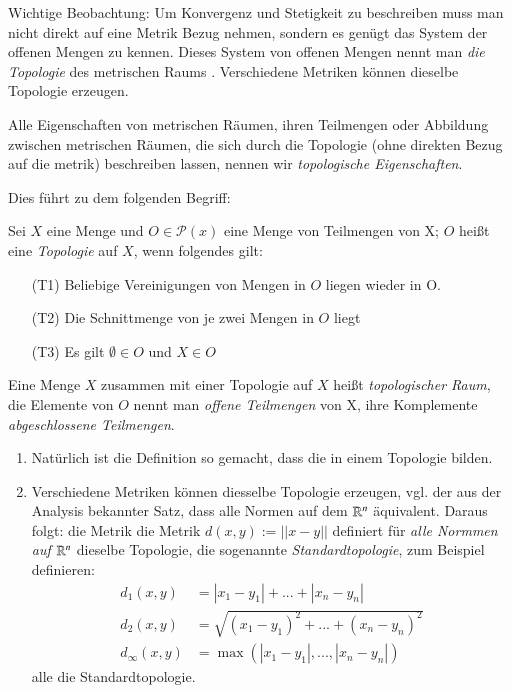 \documentclass[a4paper,10pt]{scrartcl}
\begin{document}
Wichtige Beobachtung: Um Konvergenz und Stetigkeit zu beschreiben muss man nicht direkt auf eine Metrik Bezug nehmen, sondern es genügt das System der offenen Mengen zu kennen.  Dieses System von offenen Mengen nennt man \emph{die Topologie} des metrischen Raums .  Verschiedene Metriken können dieselbe Topologie erzeugen.

Alle Eigenschaften von metrischen Räumen, ihren Teilmengen oder Abbildung zwischen metrischen Räumen, die sich durch die Topologie (ohne direkten Bezug auf die metrik) beschreiben lassen, nennen wir \emph{topologische Eigenschaften}.

Dies führt zu dem folgenden Begriff:
\begin{df}
Sei $ X $ eine Menge und $O \in \mathcal P (x)$ eine Menge von Teilmengen von X; $ O $ heißt eine \emph{Topologie} auf $ X $, wenn folgendes gilt:
\begin{itemize}
\item[(T1)] Beliebige Vereinigungen von Mengen in $ O $ liegen wieder in O.
\item[(T2)] Die Schnittmenge von je zwei Mengen in $  O  $ liegt
\item[(T3)] Es gilt $ \emptyset \in O $ und $ X \in O$
\end{itemize}
Eine Menge $ X $ zusammen mit einer Topologie auf $ X $ heißt \emph{topologischer Raum}, die Elemente von $ O $ nennt man \emph{offene Teilmengen} von X, ihre Komplemente \emph{abgeschlossene Teilmengen}.
\end{df}
\begin{note*}
\begin{enumerate}
\item Natürlich ist die Definition so gemacht, dass die in einem Topologie bilden. \fixme[fig5]
\item Verschiedene Metriken können diesselbe Topologie erzeugen, vgl. der aus der Analysis bekannter Satz, dass alle Normen auf dem $ \mathbb{R}^n $ äquivalent.  Daraus folgt: die Metrik die Metrik $ d(x,y) :=||x-y|| $ definiert für \emph{alle Normmen auf $ \mathbb{R}^n $} dieselbe Topologie, die sogenannte \emph{Standardtopologie}, zum Beispiel definieren:
\begin{align*}
d_1(x,y)&=|x_1-y_1|+...+|x_n-y_n|\\
d_2(x,y)&=\sqrt{(x_1-y_1)^2+...+(x_n-y_n)^2}\\
d_\infty(x,y)&=\max(|x_1-y_1|, ..., |x_n-y_n|)
\end{align*}
alle die Standardtopologie.
\end{enumerate}
\end{note*}
\end{document}
